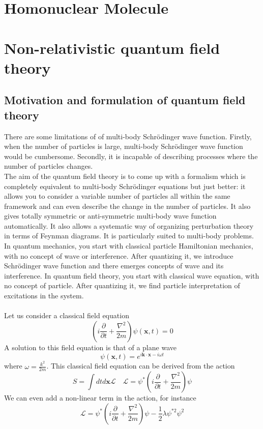 \section{Homonuclear Molecule}

\section{Non-relativistic quantum field theory}
\subsection{Motivation and formulation of quantum field theory}
There are some limitations of of multi-body Schrödinger wave function. Firstly, when the number of particles is large, multi-body Schrödinger wave function would be cumbersome. Secondly, it is incapable of describing processes where the number of particles changes.\\
The aim of the quantum field theory is to come up with a formalism which is completely equivalent to multi-body Schrödinger equations but just better:
it allows you to consider a variable number of particles all within the same framework and can even describe the change in the number of particles. 
It also gives totally symmetric or anti-symmetric multi-body wave function automatically. 
It also allows a systematic way of organizing perturbation theory in terms of Feynman diagrams.
It is particularly suited to multi-body problems.\\
In quantum mechanics, you start with classical particle Hamiltonian mechanics, with no concept of wave or interference. After quantizing it, we introduce Schrödinger wave function and there emerges concepts of wave and its interference. 
In quantum field theory, you start with classical wave equation, with no concept of particle. After quantizing it, we find particle interpretation of excitations in the system.\\ \\
Let us consider a classical field equation
\[\left (i\frac{\partial }{\partial t} + \frac{\nabla^2}{2m}\right ) \psi(\bm{x},t) = 0\]
A solution to this field equation is that of a plane wave
\[\psi(\bm{x},t) = e^{i\bm{k}\cdot\bm{x} - i\omega t}\]
where $\omega = \frac{k^2}{2m}$. This classical field equation can be derived from the action
\[S = \int dt d\bm{x} \mathcal{L} \quad \mathcal{L} = \psi^{*}\left (i\frac{\partial }{\partial t} + \frac{\nabla^2}{2m}\right ) \psi\]
We can even add a non-linear term in the action, for instance
\[\mathcal{L} = \psi^{*}\left (i\frac{\partial }{\partial t} + \frac{\nabla^2}{2m}\right )\psi - \frac{1}{2}\lambda \psi^{*2}\psi^2\]
